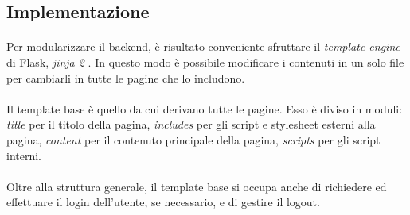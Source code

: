 \documentclass[11pt,a4paper,english]{article}
\begin{document}
\subsection{Implementazione}

\paragraph{} Per modularizzare il backend, è risultato conveniente sfruttare il \emph{template engine} di Flask, \emph{jinja 2} \cite{jinja}. In questo modo è possibile modificare i contenuti in un solo file per cambiarli in tutte le pagine che lo includono.

\paragraph{} Il template base è quello da cui derivano tutte le pagine. Esso è diviso in moduli: \emph{title} per il titolo della pagina, \emph{includes} per gli script e stylesheet esterni alla pagina, \emph{content} per il contenuto principale della pagina, \emph{scripts} per gli script interni. 

\paragraph{} Oltre alla struttura generale, il template base si occupa anche di richiedere ed effettuare il login dell'utente, se necessario, e di gestire il logout. 
\end{document}
